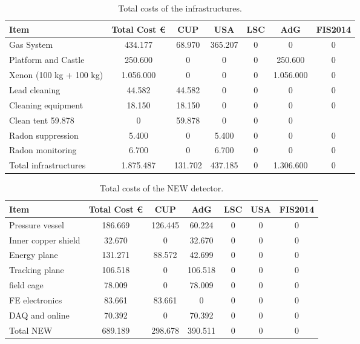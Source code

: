 \begin{table}[h!]
\begin{center}
\begin{tabular}{|l|c|c|c|c|c|c|}
\hline
 Item & Total Cost \euro & CUP	&USA &	LSC & AdG &	FIS2014 \\
 \hline
Gas System &	 434.177 & 	68.970 &	365.207 &	0 &	0 &	0 \\
Platform and Castle	& 250.600 & 	0 &	0 &	0 &	250.600 &	0 \\
Xenon (100 kg + 100 kg) &	 1.056.000 & 	0 &	0 &	0 &	1.056.000 &	0 \\
Lead cleaning	& 44.582 & 	44.582 &	0 &	0 &	0 &	0 \\
Cleaning equipment	& 18.150 & 	18.150 &	0 &	0 &	0 &	0 \\
Clean tent	 59.878 & 	0 &	59.878 &	0 &	0 &	0 \\
Radon suppression &	 5.400 & 	0 &	5.400 &	0 &	0 &	0 \\
Radon monitoring &	 6.700 & 	0 &	6.700 &	0 &	0 &	0 \\
Total infrastructures 	& 1.875.487 & 	131.702 &	437.185 &	0 &	1.306.600 &	0 \\
 \hline\hline
\end{tabular}  
\caption{Total costs of the infrastructures.}
\label{tab.TINFRA}
\end{center}
\end{table} 

\begin{table}[h!]
\begin{center}
\begin{tabular}{|l|c|c|c|c|c|c|}
\hline
 Item & Total Cost \euro & CUP	&AdG &	LSC & USA &	FIS2014 \\
 \hline
Pressure vessel &	 186.669 & 	 126.445 & 	 60.224 & 	 0 & 	 0& 0 \\ 
Inner copper shield	& 32.670 & 	 0 & 	 32.670 & 	 0 & 	 0 & 	 0 \\ 
Energy plane	& 131.271 & 	 88.572 & 	 42.699 & 	 0 & 	 0 & 	 0 \\ 
Tracking plane	& 106.518 & 	 0& 	 106.518 & 0 & 	 0 & 	 0\\ 
field cage	& 78.009 & 	 0 & 	 78.009 & 	 0 & 	 0 & 	 0 \\ 
FE electronics	& 83.661 & 	 83.661 & 	 0 & 	 0 & 	 0 & 	0 \\ 
DAQ and online &	 70.392 & 	 0 & 	 70.392 & 	 0 & 	 0 & 	 0 \\ 
Total NEW&	 689.189 & 	 298.678 & 	 390.511 & 0 & 	0 & 0 \\ 
 \hline\hline
\end{tabular}  
\caption{Total costs of the NEW detector.}
\label{tab.TNEW}
\end{center}
\end{table} 

